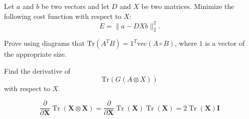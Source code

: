 \begin{exercise}
   Let $a$ and $b$ be two vectors and let $D$ and $X$ be two matrices.
   Minimize the following cost function with respect to $X$:
   \[
      E = \|a - D X b\|_2^2.
   \]
\end{exercise}

\begin{exercise}
   Prove using diagrams that $\mathrm{Tr}(A^T B) = 1^T \mathrm{vec}(A \circ B)$,
   where $1$ is a vector of the appropriate size.
\end{exercise}

\begin{exercise}
   Find the derivative of
   \[
      \mathrm{Tr}(G(A\otimes X))
   \]
   with respect to $X$.
\end{exercise}

\begin{exercise}
   \[\frac{\partial}{\partial \mathbf{X}} \operatorname{Tr}(\mathbf{X} \otimes \mathbf{X})=\frac{\partial}{\partial \mathbf{X}} \operatorname{Tr}(\mathbf{X}) \operatorname{Tr}(\mathbf{X})=2 \operatorname{Tr}(\mathbf{X}) \mathbf{I}\]
\end{exercise}
